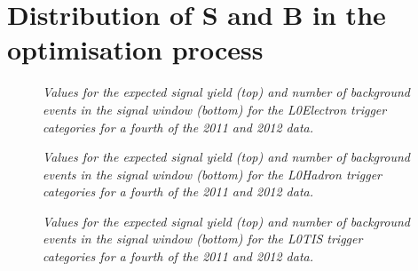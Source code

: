 \vspace*{5cm}

\section*{Distribution of S and B in the optimisation process}
\label{ap:SandB}

\begin{figure}[!h]
\begin{center}
\end{center}
\label{fig:SBEle}
\caption{\textit{Values for the expected signal yield (top) and number of background events in the signal window (bottom) for the L0Electron trigger categories for a fourth of the 2011 and 2012 \lhcb data.}}
\end{figure}

\begin{figure}[!h]
\begin{center}
\end{center}
\label{fig:SBHad}
\caption{\textit{Values for the expected signal yield (top) and number of background events in the signal window (bottom) for the L0Hadron trigger categories for a fourth of the 2011 and 2012 \lhcb data.}}
\end{figure}

\begin{figure}[!h]
\begin{center}
\end{center}
\label{fig:SBEle}
\caption{\textit{Values for the expected signal yield (top) and number of background events in the signal window (bottom) for the L0TIS trigger categories for a fourth of the 2011 and 2012 \lhcb data.}}
\end{figure}
